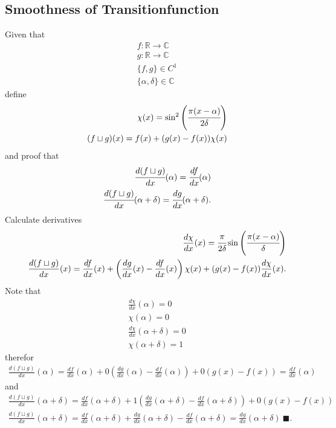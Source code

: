 \documentclass[11pt,DIV=10,final]{scrreprt} %
\newcommand{\deriv}[2]{%
  \frac{d#1}{d#2}
}
\begin{document}
{\begin{appendix}
\subsection{Smoothness of Transitionfunction}\label{proof:joint}
Given that
\begin{align}
  f: \mathbb{R} \rightarrow \mathbb{C} \\
  g: \mathbb{R} \rightarrow \mathbb{C} \\
  \{f, g\} \in C^{1} \\
  \{\alpha, \delta\} \in \mathbb{C}
\end{align}
define \hspace*{\fill}~\citep{hall2013quantum}
\begin{align}
  \chi(x) = \sin^{2}\left(\cfrac{\pi(x - \alpha)}{2\delta}\right) \\
  (f \sqcup g)(x) = f(x) + (g(x) - f(x)) \chi(x)
\end{align}
and proof that
\begin{align}
  \label{eq:deriv-f}
  \cfrac{d(f \sqcup g)}{dx}(\alpha) = \cfrac{df}{dx}(\alpha) \\
  \label{eq:deriv-g}
  \cfrac{d(f \sqcup g)}{dx}(\alpha + \delta) = \cfrac{dg}{dx}(\alpha + \delta).
\end{align}
Calculate derivatives
\begin{align}
  \deriv{\chi}{x}(x) = \cfrac{\pi}{2 \delta} \sin\left(\cfrac{\pi (x - \alpha)}{\delta}\right)\\
  \deriv{(f \sqcup g)}{x}(x) = \deriv{f}{x}(x) + \left(\deriv{g}{x}(x) - \deriv{f}{x}(x)\right)\chi(x) + (g(x) - f(x))\deriv{\chi}{x}(x).
\end{align}
Note that
\begin{align}
  \deriv{\chi}{x}(\alpha) = 0 \\
  \chi(\alpha) = 0 \\
  \deriv{\chi}{x}(\alpha + \delta) = 0 \\
  \chi(\alpha + \delta) = 1
\end{align}
therefor
\begin{align}
  \deriv{(f \sqcup g)}{x}(\alpha) = \deriv{f}{x}(\alpha) + 0 \left(\deriv{g}{x}(\alpha) - \deriv{f}{x}(\alpha)\right) + 0 (g(x) - f(x)) = \deriv{f}{x}(\alpha)
\end{align}
and
\begin{align}
  \deriv{(f \sqcup g)}{x}(\alpha + \delta) = \deriv{f}{x}(\alpha + \delta) + 1 \left(\deriv{g}{x}(\alpha + \delta) - \deriv{f}{x}(\alpha + \delta)\right) + 0 (g(x) - f(x)) \\
  \deriv{(f \sqcup g)}{x}(\alpha + \delta) = \deriv{f}{x}(\alpha + \delta) + \deriv{g}{x}(\alpha + \delta) - \deriv{f}{x}(\alpha + \delta) = \deriv{g}{x}(\alpha + \delta)~\blacksquare.
\end{align}


\end{appendix}}
\end{document}
